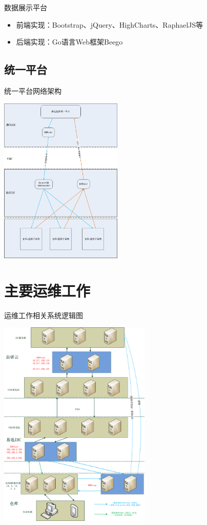 \documentclass[CJK]{beamer}
\begin{document}
\begin{CJK*}{UTF8}{gbsn}
\begin{frame}{数据展示平台}
\begin{itemize}
\item 前端实现：Bootstrap、jQuery、HighCharts、RaphaelJS等
\item 后端实现：Go语言Web框架Beego
\end{itemize}
\end{frame}

\subsection{统一平台}
\begin{frame}{统一平台网络架构}
\begin{center}
\includegraphics[height=8cm]{union-platform.png}
\end{center}
\end{frame}

\section{主要运维工作}
\begin{frame}{运维工作相关系统逻辑图}
\begin{center}
\includegraphics[height=10cm, angle=90]{iWMS.png}
\end{center}
\end{frame}


\end{CJK*}
\end{document}
